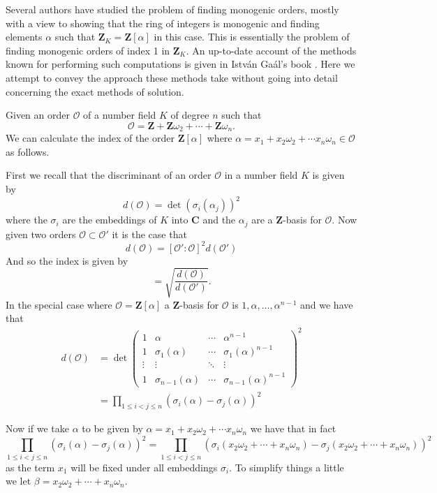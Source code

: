 \documentclass[12pt,a4paper,abstracton,bibtotoc]{scrreprt}
\theoremstyle{definition}
\newcommand{\CC}{\mathbf{C}}
\newcommand{\ZZ}{\mathbf{Z}}
\renewcommand{\O}{\mathcal{O}}
\begin{document}
\minisec{}
Several authors have studied the problem of finding monogenic orders, mostly with a view to showing that the ring of integers is monogenic and finding elements $\alpha$ such that $\ZZ_K = \ZZ[\alpha]$ in this case.
This is essentially the problem of finding monogenic orders of index 1 in $\ZZ_K$.
An up-to-date account of the methods known for performing such computations is given in Istv\'an Ga\'al's book \cite{gaal}.
Here we attempt to convey the approach these methods take without going into detail concerning the exact methods of solution.

Given an order $\O$ of a number field $K$ of degree $n$ such that
\[
\O = \ZZ + \ZZ\omega_2 + \cdots + \ZZ\omega_n.
\]
We can calculate the index of the order $\ZZ[\alpha]$ where $\alpha = x_1 + x_2\omega_2 + \cdots x_n\omega_n\in \O$ as follows.

First we recall \cite[pp. 11--15]{neukirch} that the discriminant of an order $\O$ in a number field $K$ is given by
\[
d(\O) = \det(\sigma_i(\alpha_j))^2
\]
where the $\sigma_i$ are the embeddings of $K$ into $\CC$ and the $\alpha_j$ are a $\ZZ$-basis for $\O$.
Now given two orders $\O \subset \O'$ it is the case that
\[
d(\O) = [\O':\O]^2 d(\O')
\]
And so the index is given by
\begin{equation}
[\O':\O] = \sqrt{\frac{d(\O)}{d(\O')}}.
\label{eq:indexsq}
\end{equation}
In the special case where $\O = \ZZ[\alpha]$ a $\ZZ$-basis for $\O$ is $1,\alpha,\ldots,\alpha^{n-1}$ and we have that
\begin{align*}
d(\O) &= \det\begin{pmatrix}
1 & \alpha & \cdots & \alpha^{n-1}\\
1 & \sigma_1(\alpha) & \cdots & \sigma_1(\alpha)^{n-1}\\
\vdots & \vdots & \ddots & \vdots\\
1 & \sigma_{n-1}(\alpha) & \cdots & \sigma_{n-1}(\alpha)^{n-1}
\end{pmatrix}^2\\
&=\prod_{1\le i<j\le n} (\sigma_i(\alpha) - \sigma_j(\alpha))^2
\end{align*}

Now if we take $\alpha$ to be given by $\alpha = x_1 + x_2\omega_2 + \cdots x_n\omega_n$ we have that in fact
\[
\prod_{1\le i<j\le n} (\sigma_i(\alpha) - \sigma_j(\alpha))^2 = \prod_{1\le i<j\le n} (\sigma_i(x_2\omega_2 + \cdots + x_n\omega_n) - \sigma_j(x_2\omega_2 + \cdots + x_n\omega_n))^2
\]
as the term $x_1$ will be fixed under all embeddings $\sigma_i$.
To simplify things a little we let $\beta = x_2\omega_2 + \cdots + x_n\omega_n$.
\end{document}
